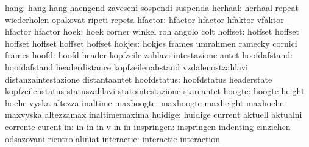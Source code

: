                      hang: hang                      hang
                           haengend                  zaveseni
                           sospendi                  suspenda
                  herhaal: herhaal                   repeat
                           wiederholen               opakovat
                           ripeti                    repeta
                  hfactor: hfactor                   hfactor
                           hfaktor                   vfaktor
                           hfactor                   hfactor  %
                     hoek: hoek                      corner
                           winkel                    roh
                           angolo                    colt
                  hoffset: hoffset                   hoffset
                           hoffset                   hoffset
                           hoffset                   hoffset %
                   hokjes: hokjes                    frames
                           umrahmen                  ramecky
                           cornici                   frames
                    hoofd: hoofd                     header
                           kopfzeile                 zahlavi
                           intestazione              antet
             hoofdafstand: hoofdafstand              headerdistance
                           kopfzeilenabstand         vzdalenostzahlavi
                           distanzaintestazione      distantaantet
              hoofdstatus: hoofdstatus               headerstate
                           kopfzeilenstatus          statuszahlavi
                           statointestazione         stareantet
                   hoogte: hoogte                    height
                           hoehe                     vyska
                           altezza                   inaltime
                maxhoogte: maxhoogte                 maxheight
                           maxhoehe                  maxvyska
                           altezzamax                inaltimemaxima
                  huidige: huidige                   current
                           aktuell                   aktualni
                           corrente                  curent
                       in: in                        in
                           in                        v
                           in                        in
               inspringen: inspringen                indenting
                           einziehen                 odsazovani
                           rientro                   aliniat
               interactie: interactie                interaction
